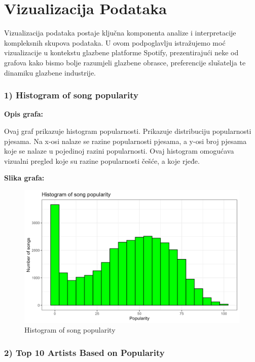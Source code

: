 \section{Vizualizacija Podataka}
	Vizualizacija podataka postaje ključna komponenta analize i interpretacije kompleksnih skupova podataka. 
	U ovom podpoglavlju istražujemo moć vizualizacije u kontekstu glazbene platforme Spotify, prezentirajući neke od grafova kako bismo bolje razumjeli glazbene obrasce, preferencije slušatelja te dinamiku glazbene industrije.
	
	\subsubsection{1) Histogram of song popularity}
	
	\textbf{Opis grafa:}
	
	Ovaj graf prikazuje histogram popularnosti. Prikazuje distribuciju popularnosti pjesama. Na x-osi nalaze se razine popularnosti pjesama, a y-osi broj pjesama koje se nalaze u pojedinoj razini popularnosti.
	Ovaj histogram omogućava vizualni pregled koje su razine popularnosti češće, a koje rjeđe. 

	\textbf{Slika grafa:}
	\begin{figure}[H]
		\includegraphics[scale=0.9]{slike/Histogram of song popularity.png}
		\centering
		\caption{Histogram of song popularity}
		
	\end{figure}

	\subsubsection{2) Top 10 Artists Based on Popularity}
	
